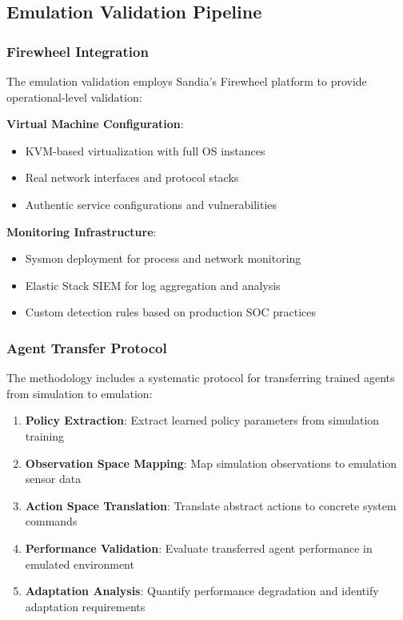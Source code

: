 \subsection{Emulation Validation Pipeline}

\subsubsection{Firewheel Integration}

The emulation validation employs Sandia's Firewheel platform to provide operational-level validation:

\textbf{Virtual Machine Configuration}: 
\begin{itemize}
    \item KVM-based virtualization with full OS instances
    \item Real network interfaces and protocol stacks
    \item Authentic service configurations and vulnerabilities
\end{itemize}

\textbf{Monitoring Infrastructure}:
\begin{itemize}
    \item Sysmon deployment for process and network monitoring
    \item Elastic Stack SIEM for log aggregation and analysis
    \item Custom detection rules based on production SOC practices
\end{itemize}

\subsubsection{Agent Transfer Protocol}

The methodology includes a systematic protocol for transferring trained agents from simulation to emulation:

\begin{enumerate}
    \item \textbf{Policy Extraction}: Extract learned policy parameters from simulation training
    
    \item \textbf{Observation Space Mapping}: Map simulation observations to emulation sensor data
    
    \item \textbf{Action Space Translation}: Translate abstract actions to concrete system commands
    
    \item \textbf{Performance Validation}: Evaluate transferred agent performance in emulated environment
    
    \item \textbf{Adaptation Analysis}: Quantify performance degradation and identify adaptation requirements
\end{enumerate}

